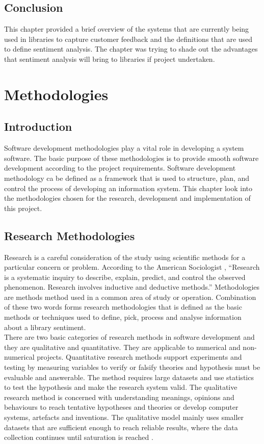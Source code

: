 \documentclass[12pt]{report}
\begin{document}
	\section{Conclusion}		
	This chapter provided a brief overview of the systems that are currently being used in libraries to capture customer feedback and the definitions that are used to define sentiment analysis. The chapter was trying to shade out the advantages that sentiment analysis will bring to libraries if project undertaken.
	
	\chapter{Methodologies}
	\section{Introduction}
	Software development methodologies play a vital role in developing a system software. The basic purpose of these methodologies is to provide smooth software development according to the project requirements. Software development methodology ca be defined as a framework that is used to structure, plan, and control the process of developing an information system. This chapter look into the methodologies chosen for the research, development and implementation of this project.\\
	
	\section{Research Methodologies}
	Research is a careful consideration of the study using scientific methods for a particular concern or problem. According to the American Sociologist \citep{babbieadventures}, “Research is a systematic inquiry to describe, explain, predict, and control the observed phenomenon. Research involves inductive and deductive methods.” Methodologies are methods method used in a common area of study or operation. Combination of these two words forms research methodologies that is defined as the basic methods or techniques used to define, pick, process and analyse information about a library sentiment.\\
	 
	There are two basic categories of research methods in software development and they are qualitative and quantitative. They are applicable to numerical and non-numerical projects. Quantitative research methods support experiments and testing by measuring variables to verify or falsify theories and hypothesis must be evaluable and answerable. The method requires large datasets and use statistics to test the hypothesis and make the research system valid. The qualitative research method is concerned with understanding meanings, opinions and behaviours to reach tentative hypotheses and theories or develop computer systems, artefacts and inventions. The qualitative model mainly uses smaller datasets that are sufficient enough to reach reliable results, where the data collection continues until saturation is reached \citep{ghauri2010research}.\\
	
\end{document}
